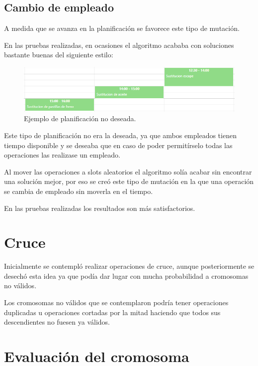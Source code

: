 \documentclass[11pt]{article}
\begin{document}
	\subsection{Cambio de empleado}
	
	A medida que se avanza en la planificación se favorece este tipo de mutación.
	
	En las pruebas realizadas, en ocasiones el algoritmo acababa con soluciones bastante buenas del siguiente estilo:
	
	\begin{figure}[h]
		\centering
		\includegraphics[width= 12.5cm]{ejemplo-unidades.png}
		\caption{Ejemplo de planificación no deseada.}
		\label{ejemplo-unidades}
	\end{figure}
	
	Este tipo de planificación no era la deseada, ya que ambos empleados tienen tiempo disponible y se deseaba que en caso de poder permitírselo todas las operaciones las realizase un empleado.
	
	Al mover las operaciones a slots aleatorios el algoritmo solía acabar sin encontrar una solución mejor, por eso se creó este tipo de mutación en la que una operación se cambia de empleado sin moverla en el tiempo.
	
	En las pruebas realizadas los resultados son más satisfactorios.
	
	\section{Cruce}
	
	Inicialmente se contempló realizar operaciones de cruce, aunque posteriormente se desechó esta idea ya que podía dar lugar con mucha probabilidad a cromosomas no válidos.
	
	Los cromosomas no válidos que se contemplaron podría tener operaciones duplicadas u operaciones cortadas por la mitad haciendo que todos sus descendientes no fuesen ya válidos.
	
	\section{Evaluación del cromosoma}
	
\end{document}
